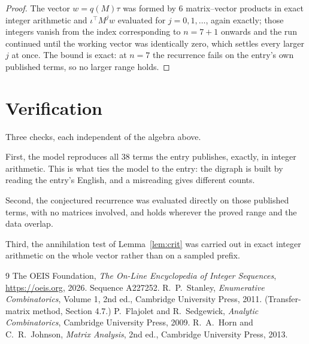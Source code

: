 \documentclass[11pt,a4paper]{article}
\theoremstyle{plain}
\theoremstyle{definition}
\begin{document}
\begin{proof}
The vector $w=q(M)\tau$ was formed by $6$ matrix--vector products in exact integer
arithmetic and $\iota^{\!\top}M^{j}w$ evaluated for $j=0,1,\dots$, again exactly; those
integers vanish from the index corresponding to $n=7+1$ onwards and the run continued
until the working vector was identically zero, which settles every larger $j$ at once. The bound is exact: at $n=7$ the recurrence fails on the entry's own published terms, so no larger range holds.
\end{proof}

\section{Verification}

Three checks, each independent of the algebra above.

First, the model reproduces all $38$ terms the entry publishes, exactly, in integer
arithmetic. This is what ties the model to the entry: the digraph is built by reading the
entry's English, and a misreading gives different counts.

Second, the conjectured recurrence was evaluated directly on those published terms, with no
matrices involved, and holds wherever the proved range and the data overlap.

Third, the annihilation test of Lemma~\ref{lem:crit} was carried out in exact integer
arithmetic on the whole vector rather than on a sampled prefix.

\begin{thebibliography}{9}
 The OEIS Foundation, \emph{The On-Line Encyclopedia of Integer
Sequences}, \url{https://oeis.org}, 2026. Sequence A227252.
 R.~P.~Stanley, \emph{Enumerative Combinatorics}, Volume 1, 2nd ed.,
Cambridge University Press, 2011. (Transfer-matrix method, Section 4.7.)
 P.~Flajolet and R.~Sedgewick, \emph{Analytic Combinatorics}, Cambridge
University Press, 2009.
 R.~A.~Horn and C.~R.~Johnson, \emph{Matrix Analysis}, 2nd ed., Cambridge
University Press, 2013.
\end{thebibliography}
\end{document}
